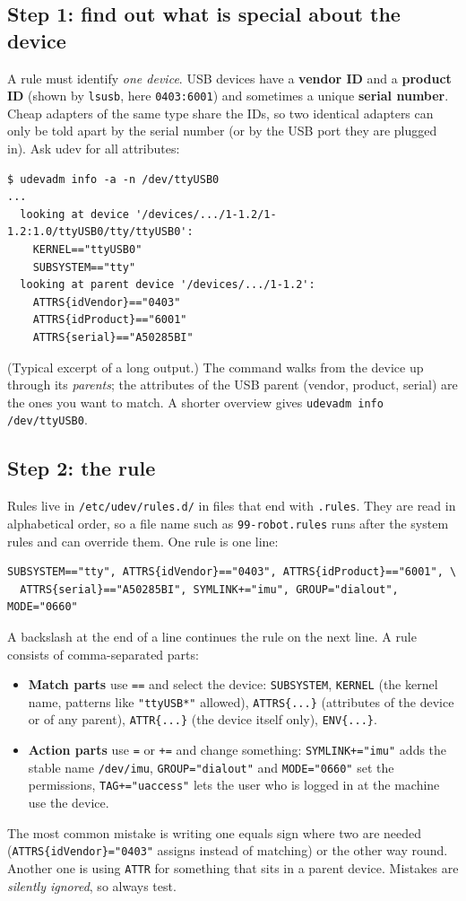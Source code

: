 \subsection*{Step 1: find out what is special about the device}
A rule must identify \emph{one device}. USB devices have a \textbf{vendor ID} and a \textbf{product ID} (shown by \texttt{lsusb}, here \texttt{0403:6001}) and sometimes a unique \textbf{serial number}. Cheap adapters of the same type share the IDs, so two identical adapters can only be told apart by the serial number (or by the USB port they are plugged in). Ask udev for all attributes:
\begin{verbatim}
$ udevadm info -a -n /dev/ttyUSB0
...
  looking at device '/devices/.../1-1.2/1-1.2:1.0/ttyUSB0/tty/ttyUSB0':
    KERNEL=="ttyUSB0"
    SUBSYSTEM=="tty"
  looking at parent device '/devices/.../1-1.2':
    ATTRS{idVendor}=="0403"
    ATTRS{idProduct}=="6001"
    ATTRS{serial}=="A50285BI"
\end{verbatim}
(Typical excerpt of a long output.) The command walks from the device up through its \emph{parents}; the attributes of the USB parent (vendor, product, serial) are the ones you want to match. A shorter overview gives \verb|udevadm info /dev/ttyUSB0|.

\subsection*{Step 2: the rule}
Rules live in \texttt{/etc/udev/rules.d/} in files that end with \texttt{.rules}. They are read in alphabetical order, so a file name such as \texttt{99-robot.rules} runs after the system rules and can override them. One rule is one line:
\begin{verbatim}
SUBSYSTEM=="tty", ATTRS{idVendor}=="0403", ATTRS{idProduct}=="6001", \
  ATTRS{serial}=="A50285BI", SYMLINK+="imu", GROUP="dialout", MODE="0660"
\end{verbatim}
A backslash at the end of a line continues the rule on the next line. A rule consists of comma-separated parts:
\begin{itemize}[nosep]
  \item \textbf{Match parts} use \verb|==| and select the device: \texttt{SUBSYSTEM}, \texttt{KERNEL} (the kernel name, patterns like \texttt{"ttyUSB*"} allowed), \texttt{ATTRS\{...\}} (attributes of the device or of any parent), \texttt{ATTR\{...\}} (the device itself only), \texttt{ENV\{...\}}.
  \item \textbf{Action parts} use \verb|=| or \verb|+=| and change something: \texttt{SYMLINK+="imu"} adds the stable name \texttt{/dev/imu}, \texttt{GROUP="dialout"} and \texttt{MODE="0660"} set the permissions, \texttt{TAG+="uaccess"} lets the user who is logged in at the machine use the device.
\end{itemize}
\begin{keyidea}[== matches, = assigns]
The most common mistake is writing one equals sign where two are needed (\verb|ATTRS{idVendor}="0403"| assigns instead of matching) or the other way round. Another one is using \texttt{ATTR} for something that sits in a parent device. Mistakes are \emph{silently ignored}, so always test.
\end{keyidea}

